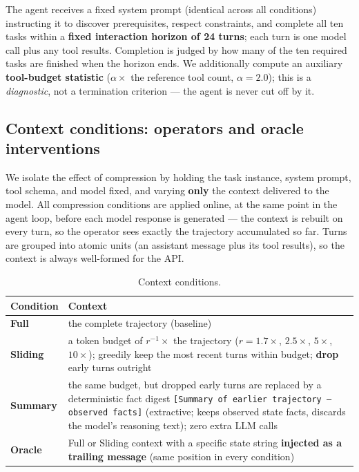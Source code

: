 \documentclass[11pt]{article}
\begin{document}
The agent receives a fixed system prompt (identical across all conditions) instructing it
to discover prerequisites, respect constraints, and complete all ten tasks within a
\textbf{fixed interaction horizon of 24 turns}; each turn is one model call plus any tool
results. Completion is judged by how many of the ten required tasks are finished when the
horizon ends. We additionally compute an auxiliary \textbf{tool-budget statistic} ($\alpha \times$ the
reference tool count, $\alpha = 2.0$); this is a \emph{diagnostic}, not a termination criterion --- the
agent is never cut off by it.

\subsection{Context conditions: operators and oracle interventions}
\label{sec:conditions}

We isolate the effect of compression by holding the task instance, system prompt, tool
schema, and model fixed, and varying \textbf{only} the context delivered to the model. All
compression conditions are applied online, at the same point in the agent loop, before
each model response is generated --- the context is rebuilt on every turn, so the operator
sees exactly the trajectory accumulated so far. Turns are grouped into atomic units (an
assistant message plus its tool results), so the context is always well-formed for the
API.

\begin{table}[t]
\centering
\small
\caption{Context conditions.}
\label{tab:conditions}
\begin{tabular}{@{}>{\raggedright\arraybackslash}p{2.2cm}>{\raggedright\arraybackslash}p{13.2cm}@{}}
\toprule
\textbf{Condition} & \textbf{Context} \\
\midrule
\textbf{Full} & the complete trajectory (baseline) \\
\textbf{Sliding} & a token budget of $r^{-1} \times$ the trajectory ($r = 1.7\times$, $2.5\times$, $5\times$, $10\times$); greedily keep the most recent turns within budget; \textbf{drop} early turns outright \\
\textbf{Summary} & the same budget, but dropped early turns are replaced by a deterministic fact digest \texttt{[Summary of earlier trajectory --- observed facts]} (extractive; keeps observed state facts, discards the model's reasoning text); zero extra LLM calls \\
\textbf{Oracle} & Full or Sliding context with a specific state string \textbf{injected as a trailing message} (same position in every condition) \\
\bottomrule
\end{tabular}
\end{table}
\end{document}

